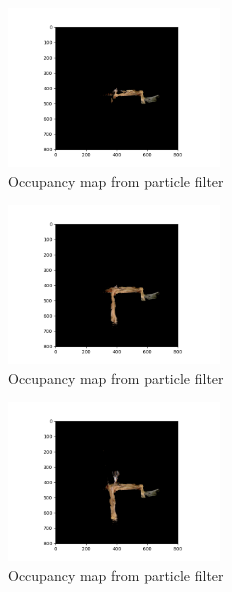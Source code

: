 \documentclass[a4paper]{article}
\begin{document}
\begin{figure}[h]
    \centering
    \includegraphics[width=0.5\textwidth]{texture_1000.png}
    \caption{Occupancy map from particle filter}
    \label{fig:particle_filter}
\end{figure}
\begin{figure}[h]
    \centering
    \includegraphics[width=0.5\textwidth]{texture_1500.png}
    \caption{Occupancy map from particle filter}
    \label{fig:particle_filter}
\end{figure}
\begin{figure}[h]
    \centering
    \includegraphics[width=0.5\textwidth]{texture_2000.png}
    \caption{Occupancy map from particle filter}
    \label{fig:particle_filter}
\end{figure}
\end{document}
